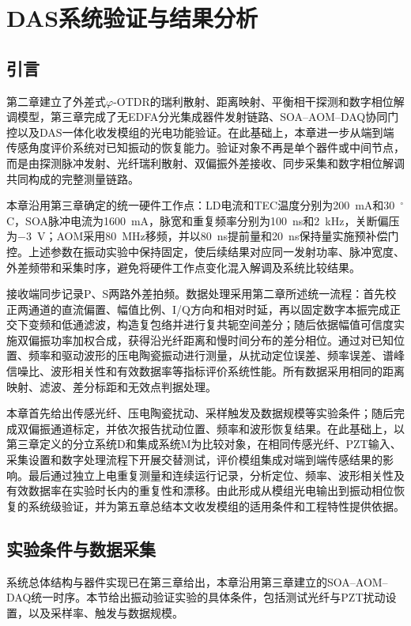 \chapter{DAS系统验证与结果分析}

\section{引言}

第二章建立了外差式$\varphi$-OTDR的瑞利散射、距离映射、平衡相干探测和数字相位解调模型，第三章完成了无EDFA分光集成器件发射链路、SOA--AOM--DAQ协同门控以及DAS一体化收发模组的光电功能验证。在此基础上，本章进一步从端到端传感角度评价系统对已知振动的恢复能力。验证对象不再是单个器件或中间节点，而是由探测脉冲发射、光纤瑞利散射、双偏振外差接收、同步采集和数字相位解调共同构成的完整测量链路。

本章沿用第三章确定的统一硬件工作点：LD电流和TEC温度分别为200~mA和30~$^\circ$C，SOA脉冲电流为1600~mA，脉宽和重复频率分别为100~ns和2~kHz，关断偏压为$-3$~V；AOM采用80~MHz移频，并以80~ns提前量和20~ns保持量实施预补偿门控。上述参数在振动实验中保持固定，使后续结果对应同一发射功率、脉冲宽度、外差频带和采集时序，避免将硬件工作点变化混入解调及系统比较结果。

接收端同步记录P、S两路外差拍频。数据处理采用第二章所述统一流程：首先校正两通道的直流偏置、幅值比例、I/Q方向和相对时延，再以固定数字本振完成正交下变频和低通滤波，构造复包络并进行复共轭空间差分；随后依据幅值可信度实施双偏振功率加权合成，获得沿光纤距离和慢时间分布的差分相位。通过对已知位置、频率和驱动波形的压电陶瓷振动进行测量，从扰动定位误差、频率误差、谱峰信噪比、波形相关性和有效数据率等指标评价系统性能。所有数据采用相同的距离映射、滤波、差分标距和无效点判据处理。

本章首先给出传感光纤、压电陶瓷扰动、采样触发及数据规模等实验条件；随后完成双偏振通道标定，并依次报告扰动位置、频率和波形恢复结果。在此基础上，以第三章定义的分立系统D和集成系统M为比较对象，在相同传感光纤、PZT输入、采集设置和数字处理流程下开展交替测试，评价模组集成对端到端传感结果的影响。最后通过独立上电重复测量和连续运行记录，分析定位、频率、波形相关性及有效数据率在实验时长内的重复性和漂移。由此形成从模组光电输出到振动相位恢复的系统级验证，并为第五章总结本文收发模组的适用条件和工程特性提供依据。

\section{实验条件与数据采集}

系统总体结构与器件实现已在第三章给出，本章沿用第三章建立的SOA--AOM--DAQ统一时序。本节给出振动验证实验的具体条件，包括测试光纤与PZT扰动设置，以及采样率、触发与数据规模。


